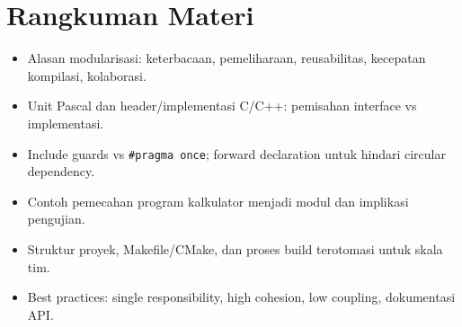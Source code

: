 \documentclass[../main.tex]{subfiles}
\begin{document}
\section{Rangkuman Materi}
\begin{itemize}
  \item Alasan modularisasi: keterbacaan, pemeliharaan, reusabilitas, kecepatan kompilasi, kolaborasi.
  \item Unit Pascal dan header/implementasi C/C++: pemisahan interface vs implementasi.
  \item Include guards vs \texttt{\#pragma once}; forward declaration untuk hindari circular dependency.
  \item Contoh pemecahan program kalkulator menjadi modul dan implikasi pengujian.
  \item Struktur proyek, Makefile/CMake, dan proses build terotomasi untuk skala tim.
  \item Best practices: single responsibility, high cohesion, low coupling, dokumentasi API.
\end{itemize}
\end{document}
